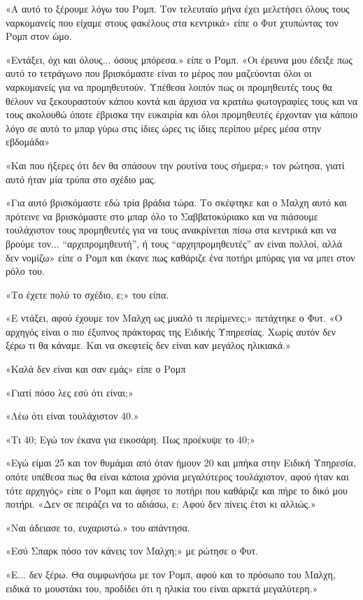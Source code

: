 \documentclass[12pt,twoside, openany]{book}
\begin{document}
«Α αυτό το ξέρουμε λόγω του Ρομπ. Τον τελευταίο μήνα έχει μελετήσει όλους τους ναρκομανείς που είχαμε στους φακέλους στα κεντρικά» είπε ο Φυτ χτυπώντας τον Ρομπ στον ώμο.

«Εντάξει, όχι και όλους... όσους μπόρεσα.» είπε ο Ρομπ. «Οι έρευνα μου έδειξε πως αυτό το τετράγωνο που βρισκόμαστε είναι το μέρος που μαζεύονται όλοι οι ναρκομανείς για να προμηθευτούν. Υπέθεσα λοιπόν πως οι προμηθευτές τους θα θέλουν να ξεκουραστούν κάπου κοντά και άρχισα να κρατάω φωτογραφίες τους και να τους ακολουθώ όποτε έβρισκα την ευκαιρία και όλοι προμηθευτές έρχονταν για κάποιο λόγο σε αυτό το μπαρ γύρω στις ίδιες ώρες τις ίδιες περίπου μέρες μέσα στην εβδομάδα»

«Και που ήξερες ότι δεν θα σπάσουν την ρουτίνα τους σήμερα;» τον ρώτησα, γιατί αυτό ήταν μία τρύπα στο σχέδιο μας.

«Για αυτό βρισκόμαστε εδώ τρία βράδια τώρα. Το σκέφτηκε και ο Μαλχη αυτό και πρότεινε να βρισκόμαστε στο μπαρ όλο το Σαββατοκύριακο και να πιάσουμε τουλάχιστον τους προμηθευτές για να τους ανακρίνεται πίσω στα κεντρικά και να βρούμε τον... “αρχιπρομηθευτή”, ή τους “αρχηπρομηθευτές” αν είναι πολλοί, αλλά δεν νομίζω» είπε ο Ρομπ και έκανε πως καθάριζε ένα ποτήρι μπύρας για να μπει στον ρόλο του.

«Το έχετε πολύ το σχέδιο, ε;» του είπα.

«Ε ντάξει, αφού έχουμε τον Μαλχη ως μυαλό τι περίμενες;» πετάχτηκε ο Φυτ. «Ο αρχηγός είναι ο πιο έξυπνος πράκτορας της Ειδικής Υπηρεσίας. Χωρίς αυτόν δεν ξέρω τι θα κάναμε. Και να σκεφτείς δεν είναι καν μεγάλος ηλικιακά.»

«Καλά δεν είναι και σαν εμάς» είπε ο Ρομπ

«Γιατί πόσο λες εσύ ότι είναι;»

«Λέω ότι είναι τουλάχιστον 40.»

«Τι 40; Εγώ τον έκανα για εικοσάρη. Πως προέκυψε το 40;»

«Εγώ είμαι 25 και τον θυμάμαι από όταν ήμουν 20 και μπήκα στην Ειδική Υπηρεσία, οπότε υπέθεσα πως θα είναι κάποια χρόνια μεγαλύτερος τουλάχιστον, αφού ήταν και τότε αρχηγός» είπε ο Ρομπ και άφησε το ποτήρι που καθάριζε και πήρε το δικό μου ποτήρι. «Δεν σε πειράζει να το αδιάσω, ε; Αφού δεν πίνεις έτσι κι αλλιώς.»

«Ναι άδειασε το, ευχαριστώ.» του απάντησα.

«Εσύ Σπαρκ πόσο τον κάνεις τον Μαλχη;» με ρώτησε ο Φυτ.

«Ε... δεν ξέρω. Θα συμφωνήσω με τον Ρομπ, αφού και το πρόσωπο του Μαλχη, ειδικά το μουστάκι του, προδίδει ότι η ηλικία του είναι αρκετά μεγαλύτερη.»
\end{document}
